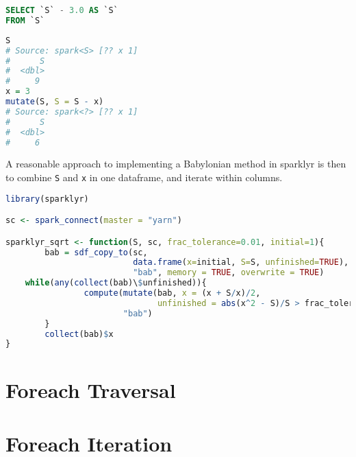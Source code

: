 \documentclass[10pt,a4paper]{article}
\begin{document}
\begin{lstlisting}[language=SQL, caption={Spark SQL query generated from attempt to form the difference between a data frame and a numeric}, label=lst:global-ok]
SELECT `S` - 3.0 AS `S`
FROM `S`
\end{lstlisting}

\begin{lstlisting}[language=R, caption={Capacity in sparklyr to form new column from the difference between a spark data frame and a numeric}, label=lst:ok-generator]
S
# Source: spark<S> [?? x 1]
#      S
#  <dbl>
#     9
x = 3
mutate(S, S = S - x)
# Source: spark<?> [?? x 1]
#      S
#  <dbl>
#     6
\end{lstlisting}

A reasonable approach to implementing a Babylonian method in sparklyr is then
to combine \texttt{S} and \texttt{x} in one dataframe, and iterate within
columns.

\begin{lstlisting}[language=R, caption={Babylonian method implementation using sparklyr}, label=lst:sparklyr-bab]
library(sparklyr)

sc <- spark_connect(master = "yarn")

sparklyr_sqrt <- function(S, sc, frac_tolerance=0.01, initial=1){
        bab = sdf_copy_to(sc,
                          data.frame(x=initial, S=S, unfinished=TRUE),
                          "bab", memory = TRUE, overwrite = TRUE)
	while(any(collect(bab)\$unfinished)){
                compute(mutate(bab, x = (x + S/x)/2,
                               unfinished = abs(x^2 - S)/S > frac_tolerance),
                        "bab")
        }
        collect(bab)$x
}
\end{lstlisting}


\section{Foreach Traversal}

\section{Foreach Iteration}\label{sec:for-iter}

\printbibliography{}
\end{document}
